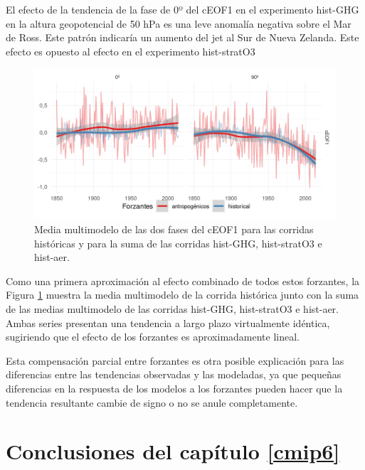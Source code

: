 \documentclass[12pt,oneside,a4paper]{reedthesis}
\begin{document}
El efecto de la tendencia de la fase de 0º del cEOF1 en el experimento hist-GHG en la altura geopotencial de 50 hPa es una leve anomalía negativa sobre el Mar de Ross.
Este patrón indicaría un aumento del jet al Sur de Nueva Zelanda.
Este efecto es opuesto al efecto en el experimento hist-stratO3



\begin{figure}

{\centering \includegraphics{figures/50-cmip6/suma-1} 

}

\caption{Media multimodelo de las dos fases del cEOF1 para las corridas históricas y para la suma de las corridas hist-GHG, hist-stratO3 e hist-aer.}\label{fig:suma}
\end{figure}

Como una primera aproximación al efecto combinado de todos estos forzantes, la Figura \ref{fig:suma} muestra la media multimodelo de la corrida histórica junto con la suma de las medias multimodelo de las corridas hist-GHG, hist-stratO3 e hist-aer.
Ambas series presentan una tendencia a largo plazo virtualmente idéntica, sugiriendo que el efecto de los forzantes es aproximadamente lineal.

Esta compensación parcial entre forzantes es otra posible explicación para las diferencias entre las tendencias observadas y las modeladas, ya que pequeñas diferencias en la respuesta de los modelos a los forzantes pueden hacer que la tendencia resultante cambie de signo o no se anule completamente.

\hypertarget{conclusiones-del-capuxedtulo-refcmip6}{%
\section{Conclusiones del capítulo \ref{cmip6}}\label{conclusiones-del-capuxedtulo-refcmip6}}
\end{document}

